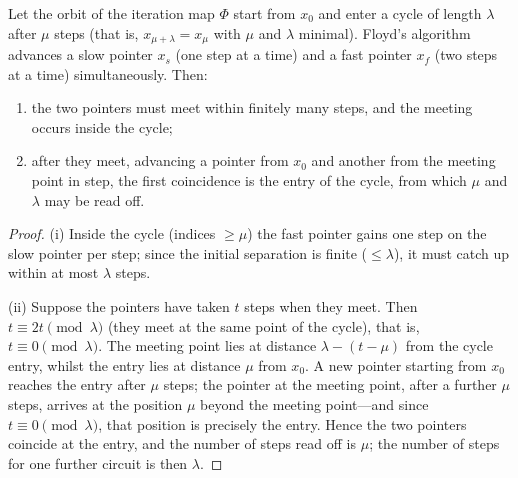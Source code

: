 \begin{lemma}\label{ch33_floyd_cycle}
Let the orbit of the iteration map $\Phi$ start from $x_0$ and enter a cycle of length $\lambda$ after $\mu$ steps (that is, $x_{\mu+\lambda} = x_\mu$ with $\mu$ and $\lambda$ minimal). Floyd's algorithm advances a slow pointer $x_s$ (one step at a time) and a fast pointer $x_f$ (two steps at a time) simultaneously. Then:
\begin{enumerate}[label=(\roman*)]
    \item the two pointers must meet within finitely many steps, and the meeting occurs inside the cycle;
    \item after they meet, advancing a pointer from $x_0$ and another from the meeting point in step, the first coincidence is the entry of the cycle, from which $\mu$ and $\lambda$ may be read off.
\end{enumerate}
\end{lemma}

\begin{proof}
(i) Inside the cycle (indices $\ge \mu$) the fast pointer gains one step on the slow pointer per step; since the initial separation is finite ($\le \lambda$), it must catch up within at most $\lambda$ steps.

(ii) Suppose the pointers have taken $t$ steps when they meet. Then $t \equiv 2t \pmod \lambda$ (they meet at the same point of the cycle), that is, $t \equiv 0 \pmod{\lambda}$. The meeting point lies at distance $\lambda - (t - \mu)$ from the cycle entry, whilst the entry lies at distance $\mu$ from $x_0$. A new pointer starting from $x_0$ reaches the entry after $\mu$ steps; the pointer at the meeting point, after a further $\mu$ steps, arrives at the position $\mu$ beyond the meeting point---and since $t \equiv 0 \pmod \lambda$, that position is precisely the entry. Hence the two pointers coincide at the entry, and the number of steps read off is $\mu$; the number of steps for one further circuit is then $\lambda$.
\end{proof}

